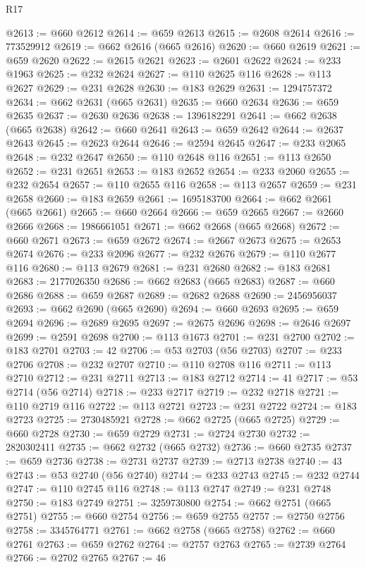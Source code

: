\begin{lexlean}{R17}
\begin{coremodule}
@2613 := @660 @2612
@2614 := @659 @2613
@2615 := @2608 @2614
@2616 := 773529912
@2619 := @662 @2616 (@665 @2616)
@2620 := @660 @2619
@2621 := @659 @2620
@2622 := @2615 @2621
@2623 := @2601 @2622
@2624 := @233 @1963
@2625 := @232 @2624
@2627 := @110 @2625 @116
@2628 := @113 @2627
@2629 := @231 @2628
@2630 := @183 @2629
@2631 := 1294757372
@2634 := @662 @2631 (@665 @2631)
@2635 := @660 @2634
@2636 := @659 @2635
@2637 := @2630 @2636
@2638 := 1396182291
@2641 := @662 @2638 (@665 @2638)
@2642 := @660 @2641
@2643 := @659 @2642
@2644 := @2637 @2643
@2645 := @2623 @2644
@2646 := @2594 @2645
@2647 := @233 @2065
@2648 := @232 @2647
@2650 := @110 @2648 @116
@2651 := @113 @2650
@2652 := @231 @2651
@2653 := @183 @2652
@2654 := @233 @2060
@2655 := @232 @2654
@2657 := @110 @2655 @116
@2658 := @113 @2657
@2659 := @231 @2658
@2660 := @183 @2659
@2661 := 1695183700
@2664 := @662 @2661 (@665 @2661)
@2665 := @660 @2664
@2666 := @659 @2665
@2667 := @2660 @2666
@2668 := 1986661051
@2671 := @662 @2668 (@665 @2668)
@2672 := @660 @2671
@2673 := @659 @2672
@2674 := @2667 @2673
@2675 := @2653 @2674
@2676 := @233 @2096
@2677 := @232 @2676
@2679 := @110 @2677 @116
@2680 := @113 @2679
@2681 := @231 @2680
@2682 := @183 @2681
@2683 := 2177026350
@2686 := @662 @2683 (@665 @2683)
@2687 := @660 @2686
@2688 := @659 @2687
@2689 := @2682 @2688
@2690 := 2456956037
@2693 := @662 @2690 (@665 @2690)
@2694 := @660 @2693
@2695 := @659 @2694
@2696 := @2689 @2695
@2697 := @2675 @2696
@2698 := @2646 @2697
@2699 := @2591 @2698
@2700 := @113 @1673
@2701 := @231 @2700
@2702 := @183 @2701
@2703 := 42
@2706 := @53 @2703 (@56 @2703)
@2707 := @233 @2706
@2708 := @232 @2707
@2710 := @110 @2708 @116
@2711 := @113 @2710
@2712 := @231 @2711
@2713 := @183 @2712
@2714 := 41
@2717 := @53 @2714 (@56 @2714)
@2718 := @233 @2717
@2719 := @232 @2718
@2721 := @110 @2719 @116
@2722 := @113 @2721
@2723 := @231 @2722
@2724 := @183 @2723
@2725 := 2730485921
@2728 := @662 @2725 (@665 @2725)
@2729 := @660 @2728
@2730 := @659 @2729
@2731 := @2724 @2730
@2732 := 2820302411
@2735 := @662 @2732 (@665 @2732)
@2736 := @660 @2735
@2737 := @659 @2736
@2738 := @2731 @2737
@2739 := @2713 @2738
@2740 := 43
@2743 := @53 @2740 (@56 @2740)
@2744 := @233 @2743
@2745 := @232 @2744
@2747 := @110 @2745 @116
@2748 := @113 @2747
@2749 := @231 @2748
@2750 := @183 @2749
@2751 := 3259730800
@2754 := @662 @2751 (@665 @2751)
@2755 := @660 @2754
@2756 := @659 @2755
@2757 := @2750 @2756
@2758 := 3345764771
@2761 := @662 @2758 (@665 @2758)
@2762 := @660 @2761
@2763 := @659 @2762
@2764 := @2757 @2763
@2765 := @2739 @2764
@2766 := @2702 @2765
@2767 := 46

\end{coremodule}
\end{lexlean}
